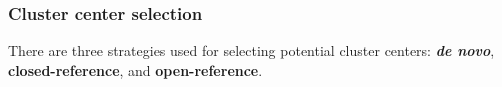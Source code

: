 













\subsubsection{Cluster center selection}



There are three strategies used for selecting potential cluster centers: {\bf \emph{de novo}}, {\bf closed-reference}, and {\bf open-reference}.

